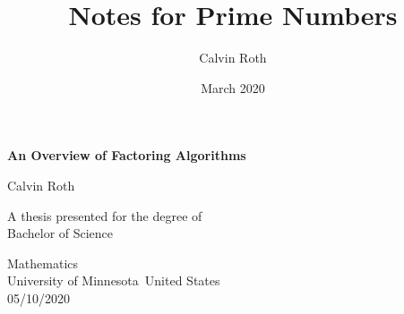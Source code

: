 \documentclass{article}
\title{Notes for Prime Numbers}
\author{Calvin Roth}
\date{March 2020}
\begin{document}
\newtheorem{theorem}{Theorem}[section]
\newtheorem{lem}{Lemma}[section]
\newtheorem{claim}[lem]{Claim}
\newtheorem{example}{Example}[section]
\newcommand{\prob}[1]{\section{} \noindent \textbf{Statement} #1 $ $\\ \textbf{Solution} $ $\\ }
\newcommand{\soln}{\noindent \textbf{Solution} $ $\\ }
\newcommand{\sol}{\noindent \textbf{Solution} $ $}
  \npthousandsep{ }

\newcommand{\IC}[1]{\noindent \textbf{Inductive Case} #1 $ $ \\}
\newcommand{\BC}[1]{\noindent \textbf{Base Case} #1 $ $ \\}

\newcommand{\inner}[1]{\langle #1 | #1\rangle}

\newcommand{\R}{\mathbb{R}}
\newcommand{\Z}{\mathbb{Z}}
\newcommand{\N}{\mathbb{N}}
\newcommand{\C}{\mathbb{C}}
\newcommand{\Q}{\mathbb{Q}}
\newcommand{\Zm}[1]{\Z / #1 \Z}
\newcommand{\bR}{$\mathbb{R}$ }
\newcommand{\bN}{$\mathbb{N}$ }
\newcommand{\bZ}{$\mathbb{Z}$ }
\newcommand{\bC}{$\mathbb{C}$ }
\newcommand{\bQ}{$\mathbb{Q}$ }
\newcommand{\softO}[1]{\tilde{O}(#1)}
\newcommand{\sftO}[1]{\tilde{O}(#1)}
\newcommand{\curve}[1]{C($\#1$)}

\newcommand{\set}[1]{\{#1\}}
\newcommand{\setc}[2]{\{$#1$ : $#2$\}}
\newcommand{\term}[2]{\textbf{Definition} \textit{#1} #2 $ $ \\}
\makeatletter
\makeatother

\begin{titlepage}
    \begin{center}
        \vspace*{1cm}
            
        \Huge
        \textbf{An Overview of Factoring Algorithms}
            
        \vspace{0.5cm}
            
        \vspace{1.5cm}
        \large  
        Calvin Roth
            
        \vfill
        \normalsize  
        A thesis presented for the degree of\\
        Bachelor of Science
            
        \vspace{0.8cm}
            
        \Large
        Mathematics\\
        University of Minnesota\
        United States\\
        05/10/2020
            
    \end{center}
\end{titlepage}
\end{document}
